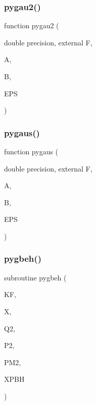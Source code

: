 \mbox{\label{pythia-6_84_824_8f_ad2bff8fc5a17d91922af88f41b6e22f3}} 
\subsubsection{\texorpdfstring{pygau2()}{pygau2()}}
{\footnotesize\ttfamily function pygau2 (\begin{DoxyParamCaption}\item[{double precision, external}]{F,  }\item[{}]{A,  }\item[{}]{B,  }\item[{}]{E\+PS }\end{DoxyParamCaption})}

\mbox{\label{pythia-6_84_824_8f_a54737ed1fa8203d34f6b7e41f8edaf45}} 
\subsubsection{\texorpdfstring{pygaus()}{pygaus()}}
{\footnotesize\ttfamily function pygaus (\begin{DoxyParamCaption}\item[{double precision, external}]{F,  }\item[{}]{A,  }\item[{}]{B,  }\item[{}]{E\+PS }\end{DoxyParamCaption})}

\mbox{\label{pythia-6_84_824_8f_af5ad5b58bca45571f9326336c1b90006}} 
\subsubsection{\texorpdfstring{pygbeh()}{pygbeh()}}
{\footnotesize\ttfamily subroutine pygbeh (\begin{DoxyParamCaption}\item[{}]{KF,  }\item[{}]{X,  }\item[{}]{Q2,  }\item[{}]{P2,  }\item[{}]{P\+M2,  }\item[{}]{X\+P\+BH }\end{DoxyParamCaption})}


